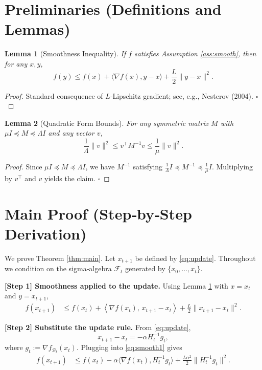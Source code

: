 \documentclass{article}
\newtheorem{lemma}{Lemma}[section]
\begin{document}
\newpage

\section*{Preliminaries (Definitions and Lemmas)}
\begin{lemma}[Smoothness Inequality]\label{lem:smooth}
If $f$ satisfies Assumption \ref{ass:smooth}, then for any $x,y$,
\[
f(y)\le f(x)+\langle\nabla f(x),y-x\rangle+\frac{L}{2}\|y-x\|^{2}.
\]
\end{lemma}
\begin{proof}
Standard consequence of $L$‑Lipschitz gradient; see, e.g., Nesterov (2004). \hfill $\square$
\end{proof}

\begin{lemma}[Quadratic Form Bounds]\label{lem:quad}
For any symmetric matrix $M$ with $\mu I\preceq M\preceq \Lambda I$ and any vector $v$,
\[
\frac{1}{\Lambda}\|v\|^{2}\le v^{\top}M^{-1}v\le\frac{1}{\mu}\|v\|^{2}.
\]
\end{lemma}
\begin{proof}
Since $\mu I\preceq M\preceq\Lambda I$, we have $M^{-1}$ satisfying
$\frac{1}{\Lambda}I\preceq M^{-1}\preceq\frac{1}{\mu}I$. Multiplying by $v^{\top}$ and $v$ yields the claim. \hfill $\square$
\end{proof}

\section*{Main Proof (Step‑by‑Step Derivation)}
We prove Theorem \ref{thm:main}. Let $x_{t+1}$ be defined by \eqref{eq:update}. Throughout we condition on the sigma‑algebra $\mathcal{F}_{t}$ generated by $\{x_{0},\dots,x_{t}\}$.

\noindent\textbf{[Step 1] Smoothness applied to the update.}  
Using Lemma \ref{lem:smooth} with $x=x_{t}$ and $y=x_{t+1}$,
\begin{align}
f(x_{t+1}) &\le f(x_{t})+\left\langle \nabla f(x_{t}),\,x_{t+1}-x_{t}\right\rangle
+\frac{L}{2}\|x_{t+1}-x_{t}\|^{2}. \label{eq:smooth1}
\end{align}

\noindent\textbf{[Step 2] Substitute the update rule.}  
From \eqref{eq:update},
\[
x_{t+1}-x_{t}= -\alpha H_{t}^{-1}g_{t},
\]
where $g_{t}:=\nabla f_{\mathcal{B}_{t}}(x_{t})$.
Plugging into \eqref{eq:smooth1} gives
\begin{align}
f(x_{t+1}) &\le f(x_{t}) -\alpha\langle \nabla f(x_{t}), H_{t}^{-1}g_{t}\rangle
+\frac{L\alpha^{2}}{2}\|H_{t}^{-1}g_{t}\|^{2}. \label{eq:expand1}
\end{align}
\end{document}
